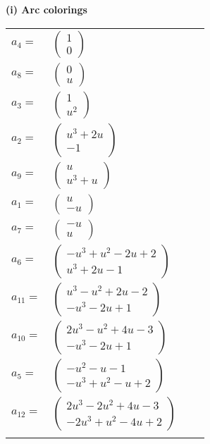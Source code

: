 \documentclass[1p]{elsarticle_modified}
\theoremstyle{definition}
\begin{document}
\flushleft \textbf{(i) Arc colorings}\\
\begin{tabular}{m{7pt} m{180pt} m{7pt} m{180pt} }
\flushright $a_{4}=$&$\begin{pmatrix}1\\0\end{pmatrix}$ \\
\flushright $a_{8}=$&$\begin{pmatrix}0\\u\end{pmatrix}$ \\
\flushright $a_{3}=$&$\begin{pmatrix}1\\u^2\end{pmatrix}$ \\
\flushright $a_{2}=$&$\begin{pmatrix}u^3+2 u\\-1\end{pmatrix}$ \\
\flushright $a_{9}=$&$\begin{pmatrix}u\\u^3+u\end{pmatrix}$ \\
\flushright $a_{1}=$&$\begin{pmatrix}u\\- u\end{pmatrix}$ \\
\flushright $a_{7}=$&$\begin{pmatrix}- u\\u\end{pmatrix}$ \\
\flushright $a_{6}=$&$\begin{pmatrix}- u^3+u^2-2 u+2\\u^3+2 u-1\end{pmatrix}$ \\
\flushright $a_{11}=$&$\begin{pmatrix}u^3- u^2+2 u-2\\- u^3-2 u+1\end{pmatrix}$ \\
\flushright $a_{10}=$&$\begin{pmatrix}2 u^3- u^2+4 u-3\\- u^3-2 u+1\end{pmatrix}$ \\
\flushright $a_{5}=$&$\begin{pmatrix}- u^2- u-1\\- u^3+u^2- u+2\end{pmatrix}$ \\
\flushright $a_{12}=$&$\begin{pmatrix}2 u^3-2 u^2+4 u-3\\-2 u^3+u^2-4 u+2\end{pmatrix}$\\&\end{tabular}
\end{document}
